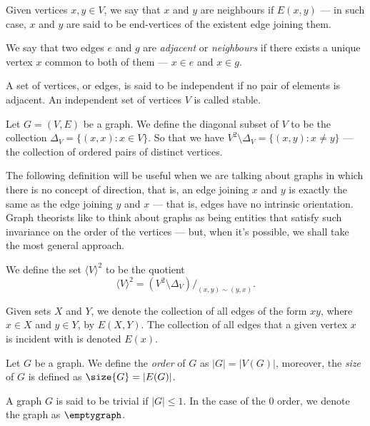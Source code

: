 \begin{definition}[Adjacency]
Given vertices \(x, y \in V\), we say that \(x\) and \(y\) are neighbours if
\(E(x, y)\) --- in such case, \(x\) and \(y\) are said to be end-vertices of the
existent edge joining them.

We say that two edges \(e\) and \(g\) are \emph{adjacent} or \emph{neighbours}
if there exists a unique vertex \(x\) common to both of them --- \(x \in e\)
and \(x \in g\).

A set of vertices, or edges, is said to be independent if no pair of elements
is adjacent. An independent set of vertices \(V\) is called stable.
\end{definition}

\begin{definition}
Let \(G = (V, E)\) be a graph. We define the diagonal subset of \(V\) to be
the collection \(\Delta_V = \{(x, x) \colon x \in V\}\). So that we have
\(V^2 \setminus \Delta_V = \{(x, y) \colon x \neq y\}\) --- the collection of
ordered pairs of distinct vertices.
\end{definition}

The following definition will be useful when we are talking about graphs in
which there is no concept of direction, that is, an edge joining \(x\) and \(y\)
is exactly the same as the edge joining \(y\) and \(x\) --- that is, edges have no
intrinsic orientation. Graph theorists like to think about graphs as being
entities that satisfy such invariance on the order of the vertices --- but, when
it's possible, we shall take the most general approach.

\begin{definition}
We define the set \(\langle V \rangle^2\) to be the quotient
\[
  \langle V \rangle^2 = (V^2 \setminus \Delta_V)/_{(x, y) \sim (y, x)}.
\]
\end{definition}

\begin{notation}
Given sets \(X\) and \(Y\), we denote the collection of all edges of the form
\(xy\), where \(x \in X\) and \(y \in Y\), by \(E(X, Y)\). The collection of
all edges that a given vertex \(x\) is incident with is denoted \(E(x)\).
\end{notation}

\begin{definition}\label{def:graph-order-size}
Let \(G\) be a graph. We define the \emph{order} of \(G\) as \(|G| =|V(G)|\),
moreover, the \emph{size} of \(G\) is defined as \(\size{G} = |E(G)|\).
\end{definition}

\begin{definition}
A graph \(G\) is said to be trivial if \(|G| \leq 1\). In the case of the
\(0\) order, we denote the graph as \(\emptygraph\).
\end{definition}
